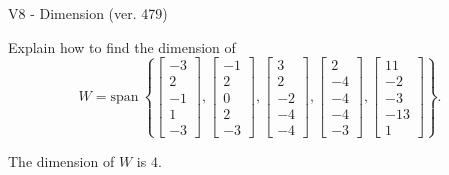 \begin{exercise}
  \begin{exerciseTitle}V8 - Dimension (ver. 479)\end{exerciseTitle}
  \begin{exerciseStatement}
    Explain how to find the dimension of 
\[W=\mathrm{span}\ \left\{\left[\begin{array}{r}
-3 \\
2 \\
-1 \\
1 \\
-3
\end{array}\right] , \left[\begin{array}{r}
-1 \\
2 \\
0 \\
2 \\
-3
\end{array}\right] , \left[\begin{array}{r}
3 \\
2 \\
-2 \\
-4 \\
-4
\end{array}\right] , \left[\begin{array}{r}
2 \\
-4 \\
-4 \\
-4 \\
-3
\end{array}\right] , \left[\begin{array}{r}
11 \\
-2 \\
-3 \\
-13 \\
1
\end{array}\right]\right\}.\]



  \end{exerciseStatement}
  \begin{exerciseAnswer}
   The dimension of \(W\) is  \(4\).
  


  \end{exerciseAnswer}
\end{exercise}